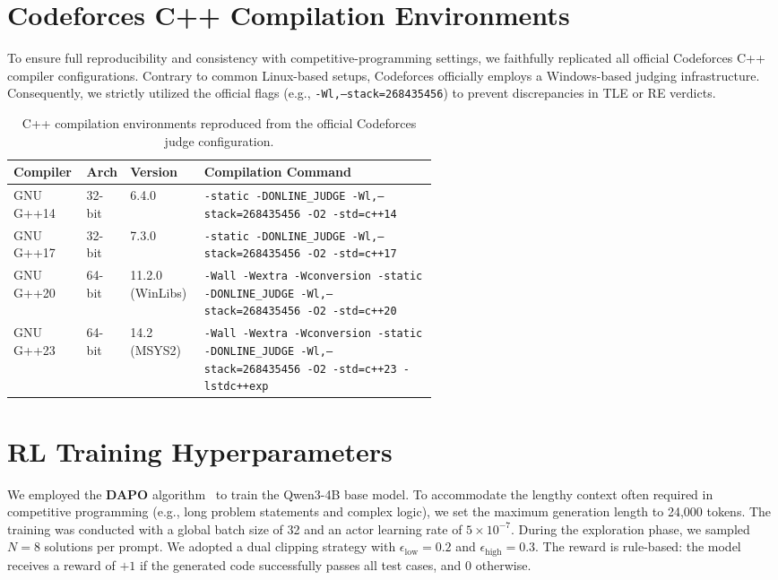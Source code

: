 \documentclass[11pt]{article}
\begin{document}
\section{Codeforces C++ Compilation Environments}
\label{appx:compilation}

To ensure full reproducibility and consistency with competitive-programming settings, we faithfully replicated all official Codeforces C++ compiler configurations. 
Contrary to common Linux-based setups, Codeforces officially employs a Windows-based judging infrastructure. Consequently, we strictly utilized the official flags (e.g., \texttt{-Wl,--stack=268435456}) to prevent discrepancies in TLE or RE verdicts.

\begin{table}[h!]
\centering
\small
\begin{tabular}{lll p{0.55\linewidth}}
\toprule
\textbf{Compiler} & \textbf{Arch} & \textbf{Version} & \textbf{Compilation Command} \\
\midrule
GNU G++14 & 32-bit & 6.4.0 &
\texttt{-static -DONLINE\_JUDGE -Wl,--stack=268435456 -O2 -std=c++14} \\
GNU G++17 & 32-bit & 7.3.0 &
\texttt{-static -DONLINE\_JUDGE -Wl,--stack=268435456 -O2 -std=c++17} \\
GNU G++20 & 64-bit & 11.2.0 (WinLibs) &
\texttt{-Wall -Wextra -Wconversion -static -DONLINE\_JUDGE -Wl,--stack=268435456 -O2 -std=c++20} \\
GNU G++23 & 64-bit & 14.2 (MSYS2) &
\texttt{-Wall -Wextra -Wconversion -static -DONLINE\_JUDGE -Wl,--stack=268435456 -O2 -std=c++23 -lstdc++exp} \\
\bottomrule
\end{tabular}
\caption{C++ compilation environments reproduced from the official Codeforces judge configuration.}
\label{tab:cf-env}
\end{table}

\section{RL Training Hyperparameters}
\label{appx:rl_details}

We employed the \textbf{DAPO} algorithm~\cite{yu2025dapo} to train the Qwen3-4B base model. 
To accommodate the lengthy context often required in competitive programming (e.g., long problem statements and complex logic), we set the maximum generation length to 24,000 tokens.
The training was conducted with a global batch size of 32 and an actor learning rate of $5 \times 10^{-7}$. During the exploration phase, we sampled $N=8$ solutions per prompt. We adopted a dual clipping strategy with $\epsilon_{\text{low}}=0.2$ and $\epsilon_{\text{high}}=0.3$. 
The reward is rule-based: the model receives a reward of $+1$ if the generated code successfully passes all test cases, and $0$ otherwise.
\end{document}
